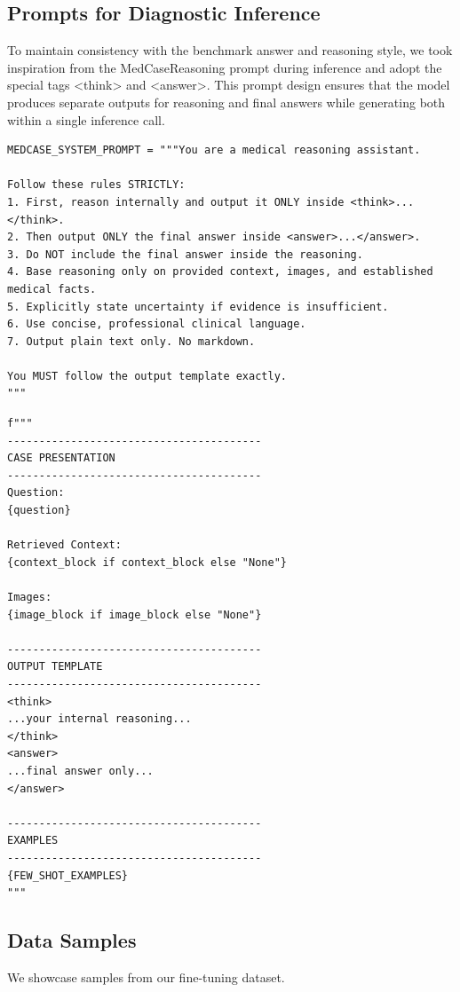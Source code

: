 \subsection{Prompts for Diagnostic Inference}

To maintain consistency with the benchmark answer and reasoning style, we took inspiration from the MedCaseReasoning prompt during inference and adopt the special tags <think> and <answer>. This prompt design ensures that the model produces separate outputs for reasoning and final answers while generating both within a single inference call.

\begin{lstlisting}[caption={System Prompt Used for Medical Reasoning}, label={lst:system-prompt}]
MEDCASE_SYSTEM_PROMPT = """You are a medical reasoning assistant.

Follow these rules STRICTLY:
1. First, reason internally and output it ONLY inside <think>...</think>.
2. Then output ONLY the final answer inside <answer>...</answer>.
3. Do NOT include the final answer inside the reasoning.
4. Base reasoning only on provided context, images, and established medical facts.
5. Explicitly state uncertainty if evidence is insufficient.
6. Use concise, professional clinical language.
7. Output plain text only. No markdown.

You MUST follow the output template exactly.
"""
\end{lstlisting}

\begin{lstlisting}[caption={Inference-Time Prompt Formatting Template}, label={lst:prompt-format}]
f"""
----------------------------------------
CASE PRESENTATION
----------------------------------------
Question:
{question}

Retrieved Context:
{context_block if context_block else "None"}

Images:
{image_block if image_block else "None"}

----------------------------------------
OUTPUT TEMPLATE
----------------------------------------
<think>
...your internal reasoning...
</think>
<answer>
...final answer only...
</answer>

----------------------------------------
EXAMPLES
----------------------------------------
{FEW_SHOT_EXAMPLES}
"""
\end{lstlisting}

\subsection{Data Samples}
We showcase samples from our fine-tuning dataset. 

